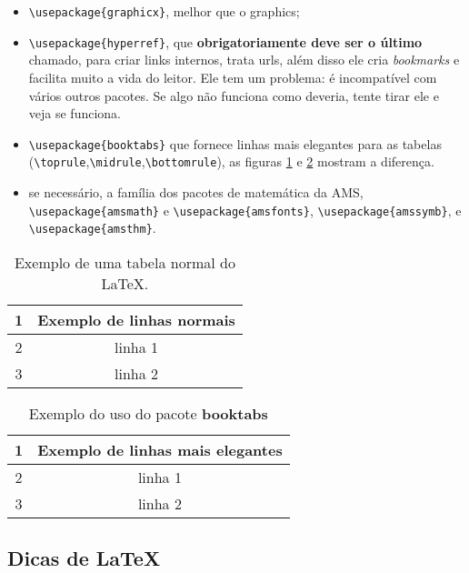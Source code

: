 \documentclass{article}
\begin{document}
\begin{outline}
\begin{itemize}
    \item \verb!\usepackage{graphicx}!, melhor que o graphics;
    \item \verb!\usepackage{hyperref}!, que \textbf{obrigatoriamente deve ser o último} chamado, para criar links internos, trata urls, além disso ele cria \textit{bookmarks} e facilita muito a vida do leitor. Ele tem um problema: é incompatível com vários outros pacotes. Se algo não funciona como deveria, tente tirar ele e veja se funciona.
    \item \verb!\usepackage{booktabs}! que fornece linhas mais elegantes para as tabelas (\verb!\toprule!,\verb!\midrule!,\verb!\bottomrule!), as figuras \ref{tab:tab2} e \ref{tab:tab1} mostram a diferença.
    \item se necessário, a família dos pacotes de matemática da AMS, \verb!\usepackage{amsmath}! e
    \verb!\usepackage{amsfonts}!, \verb!\usepackage{amssymb}!, e \verb!\usepackage{amsthm}!.
\end{itemize}

\begin{table}[htb]
    \centering
        \caption{Exemplo de uma tabela normal do \LaTeX .}
    \begin{tabular}{cc}
    \hline
        1 & Exemplo de linhas normais   \\
        \hline
        2 & linha 1\\
        3 & linha 2\\
        \hline
    \end{tabular}

    \label{tab:tab2}
\end{table}

\begin{table}[htb]
    \centering
        \caption{Exemplo do uso do pacote \textbf{booktabs} }
    \begin{tabular}{cc}
    \toprule
        1 & Exemplo de linhas mais elegantes   \\
        \midrule
        2 & linha 1\\
        3 & linha 2\\
        \bottomrule
    \end{tabular}

    \label{tab:tab1}
\end{table}

\subsection{Dicas de \LaTeX}


\end{outline}
\end{document}
